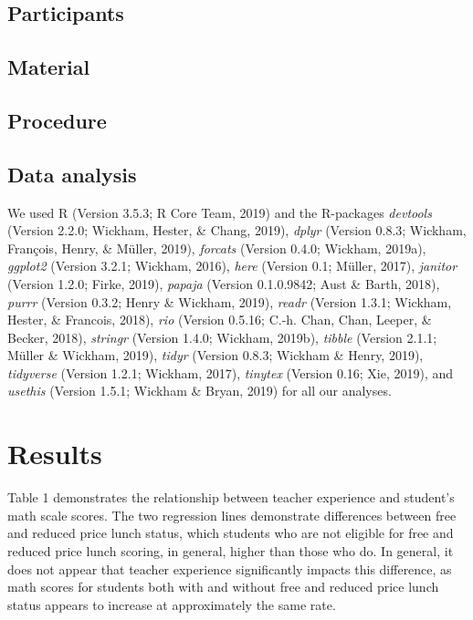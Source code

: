 \documentclass[man]{apa6}
\begin{document}
\subsection{Participants}\label{participants}

\subsection{Material}\label{material}

\subsection{Procedure}\label{procedure}

\subsection{Data analysis}\label{data-analysis}

We used R (Version 3.5.3; R Core Team, 2019) and the R-packages
\emph{devtools} (Version 2.2.0; Wickham, Hester, \& Chang, 2019),
\emph{dplyr} (Version 0.8.3; Wickham, François, Henry, \& Müller, 2019),
\emph{forcats} (Version 0.4.0; Wickham, 2019a), \emph{ggplot2} (Version
3.2.1; Wickham, 2016), \emph{here} (Version 0.1; Müller, 2017),
\emph{janitor} (Version 1.2.0; Firke, 2019), \emph{papaja} (Version
0.1.0.9842; Aust \& Barth, 2018), \emph{purrr} (Version 0.3.2; Henry \&
Wickham, 2019), \emph{readr} (Version 1.3.1; Wickham, Hester, \&
Francois, 2018), \emph{rio} (Version 0.5.16; C.-h. Chan, Chan, Leeper,
\& Becker, 2018), \emph{stringr} (Version 1.4.0; Wickham, 2019b),
\emph{tibble} (Version 2.1.1; Müller \& Wickham, 2019), \emph{tidyr}
(Version 0.8.3; Wickham \& Henry, 2019), \emph{tidyverse} (Version
1.2.1; Wickham, 2017), \emph{tinytex} (Version 0.16; Xie, 2019), and
\emph{usethis} (Version 1.5.1; Wickham \& Bryan, 2019) for all our
analyses.

\section{Results}\label{results}

Table 1 demonstrates the relationship between teacher experience and
student's math scale scores. The two regression lines demonstrate
differences between free and reduced price lunch status, which students
who are not eligible for free and reduced price lunch scoring, in
general, higher than those who do. In general, it does not appear that
teacher experience significantly impacts this difference, as math scores
for students both with and without free and reduced price lunch status
appears to increase at approximately the same rate.
\end{document}
